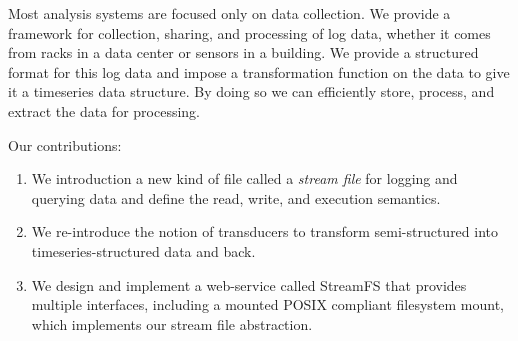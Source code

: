 Most analysis systems are focused only on data collection.  We provide a framework for collection, sharing, and processing
of log data, whether it comes from racks in a data center or sensors in a building.  We provide a structured format for 
this log data and impose a transformation function on the data to give it a timeseries data structure.  By doing so
we can efficiently store, process, and extract the data for processing.

Our contributions:
\begin{enumerate}
\item We introduction a new kind of file called a \emph{stream file} for logging and querying data and 
define the read, write, and execution semantics.
\item We re-introduce the notion of transducers to transform semi-structured into timeseries-structured data and back.
\item We design and implement a web-service called StreamFS that provides multiple interfaces, including a mounted
POSIX compliant filesystem mount, which implements our stream file abstraction.
\end{enumerate}


